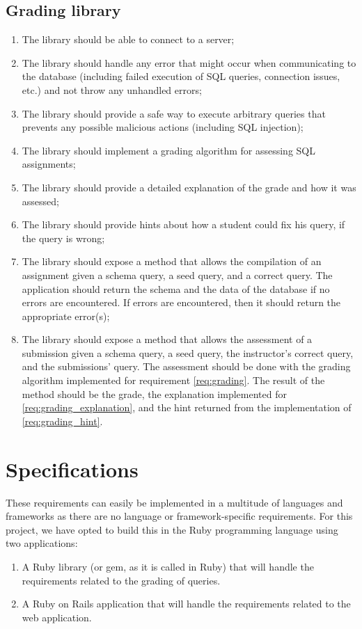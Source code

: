 \subsection{Grading library}
\begin{enumerate}[label=G-\arabic*]
  \item The library should be able to connect to a  server;
  \item The library should handle any error that might occur when communicating to the database (including failed execution of SQL queries, connection issues, etc.) and not throw any unhandled errors;
  \item The library should provide a safe way to execute arbitrary queries that prevents any possible malicious actions (including SQL injection);
  \item The library should implement a grading algorithm for assessing SQL assignments; \label{req:grading}
  \item The library should provide a detailed explanation of the grade and how it was assessed; \label{req:grading_explanation}
  \item The library should provide hints about how a student could fix his query, if the query is wrong; \label{req:grading_hint}
  \item The library should expose a method that allows the compilation of an assignment given a schema query, a seed query, and a correct query. The application should return the schema and the data of the database if no errors are encountered. If errors are encountered, then it should return the appropriate error(s);
  \item The library should expose a method that allows the assessment of a submission given a schema query, a seed query, the instructor's correct query, and the submissions' query.  The assessment should be done with the grading algorithm implemented for requirement \ref{req:grading}. The result of the method should be the grade, the explanation implemented for \ref{req:grading_explanation}, and the hint returned from the implementation of \ref{req:grading_hint}.
\end{enumerate}

\section{Specifications} \label{ch:reqandspec:sec:spec}

These requirements can easily be implemented in a multitude of languages and frameworks as there are no language or framework-specific requirements. For this project, we have opted to build this in the Ruby programming language using two applications:
\begin{enumerate}
    \item A Ruby library (or gem, as it is called in Ruby) that will handle the requirements related to the grading of queries.
    \item A Ruby on Rails application that will handle the requirements related to the web application.
\end{enumerate}

